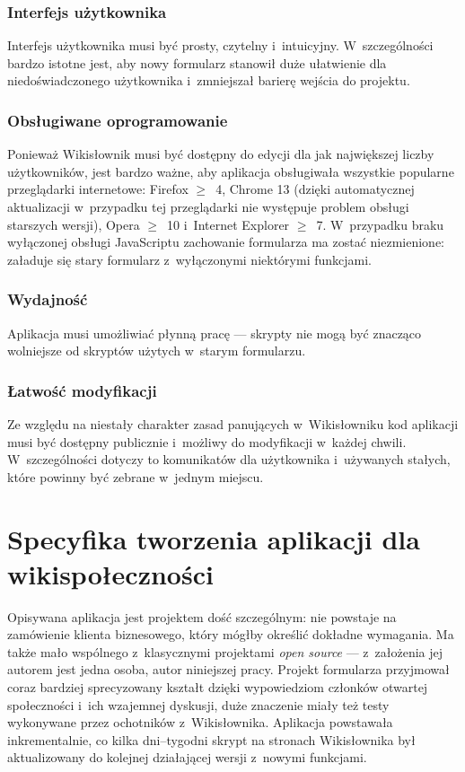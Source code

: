 \subsubsection{Interfejs użytkownika}
Interfejs użytkownika musi być prosty, czytelny i~intuicyjny. W~szczególności bardzo istotne jest, aby nowy formularz stanowił duże ułatwienie dla niedoświadczonego użytkownika i~zmniejszał barierę wejścia do projektu.

\subsubsection{Obsługiwane oprogramowanie}
Ponieważ Wikisłownik musi być dostępny do edycji dla jak największej liczby użytkowników, jest bardzo ważne, aby aplikacja obsługiwała wszystkie popularne przeglądarki internetowe: Firefox $\geq$~4, Chrome 13 (dzięki automatycznej aktualizacji w~przypadku tej przeglądarki nie występuje problem obsługi starszych wersji), Opera $\geq$~10 i~Internet Explorer $\geq$~7. W~przypadku braku wyłączonej obsługi JavaScriptu zachowanie formularza ma zostać niezmienione: załaduje się stary formularz z~wyłączonymi niektórymi funkcjami.

\subsubsection{Wydajność}
Aplikacja musi umożliwiać płynną pracę --- skrypty nie mogą być znacząco wolniejsze od skryptów użytych w~starym formularzu.

\subsubsection{Łatwość modyfikacji}
Ze względu na niestały charakter zasad panujących w~Wikisłowniku kod aplikacji musi być dostępny publicznie i~możliwy do modyfikacji w~każdej chwili. W~szczególności dotyczy to komunikatów dla użytkownika i~używanych stałych, które powinny być zebrane w~jednym miejscu.

\section{Specyfika tworzenia aplikacji dla wikispołeczności}
\label{sec:spec}
Opisywana aplikacja jest projektem dość szczególnym: nie powstaje na zamówienie klienta biznesowego, który mógłby określić dokładne wymagania. Ma także mało wspólnego z~klasycznymi projektami \emph{open source} --- z~założenia jej autorem jest jedna osoba, autor niniejszej pracy. Projekt formularza przyjmował coraz bardziej sprecyzowany kształt dzięki wypowiedziom członków otwartej społeczności i~ich wzajemnej dyskusji, duże znaczenie miały też testy wykonywane przez ochotników z~Wikisłownika. Aplikacja powstawała inkrementalnie, co kilka dni--tygodni skrypt na stronach Wikisłownika był aktualizowany do kolejnej działającej wersji z~nowymi funkcjami.

